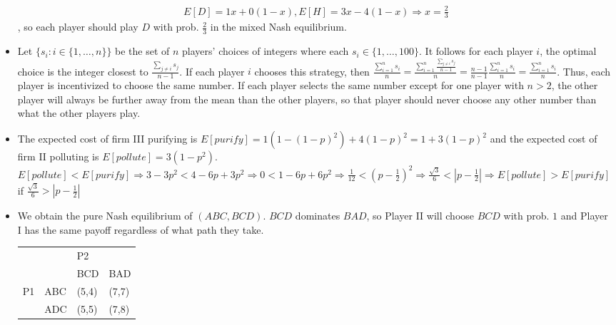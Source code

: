 \documentclass[10pt]{article}[H]
\begin{document}
\begin{itemize}
    \begin{align*}
        E[D]=1x+0(1-x),E[H]=3x-4(1-x)\Rightarrow x=\frac{2}{3}
    \end{align*}
    , so each player should play $D$ with prob. $\frac{2}{3}$ in the mixed Nash equilibrium. 
    \item [\textbf{Exercise 4.14}] Let $\{s_i:i\in\{1,\ldots,n\}\}$ be the set of $n$ players' choices of integers where each $s_i\in\{1,\ldots,100\}$. It follows for each player $i$, the optimal choice is the integer closest to $\frac{\displaystyle\sum_{j\neq i}s_j}{n-1}$. 
    If each player $i$ chooses this strategy, then $\frac{\displaystyle\sum_{i=1}^{n}s_i}{n}=\frac{\displaystyle\sum_{i=1}^{n}\frac{\displaystyle\sum_{j\neq i}s_j}{n-1}}{n}=\frac{n-1}{n-1}\frac{\displaystyle\sum_{i=1}^{n}s_i}{n}=\frac{\displaystyle\sum_{i=1}^{n}s_i}{n}$. Thus, each player is incentivized to choose the same number.
    If each player selects the same number except for one player with $n>2$, the other player will always be further away from the mean than the other players, so that player should never choose any other number than what the other players play. 
    \item [\textbf{Exercise 4.15}] The expected cost of firm III purifying is $E[purify]=1(1-{(1-p)}^2)+4{(1-p)}^2=1+3{(1-p)}^2$ and the expected cost of firm II polluting is $E[pollute]=3(1-p^2)$.
    $E[pollute]<E[purify]\Rightarrow 3-3p^2<4-6p+3p^2\Rightarrow 0<1-6p+6p^2\Rightarrow \frac{1}{12}<(p-\frac{1}{2})^2 \Rightarrow \frac{\sqrt{3}}{6}<|p-\frac{1}{2}|\Rightarrow E[pollute]>E[purify]$ if $\frac{\sqrt{3}}{6}>|p-\frac{1}{2}|$
    \item [\textbf{Exercise 4.17}] We obtain the pure Nash equilibrium of $(ABC,BCD)$. $BCD$ dominates $BAD$, so Player II will choose $BCD$ with prob. $1$ and Player I has the same payoff regardless of what path they take.
    \begin{table}[H]
        \begin{tabular}{llll}
                                &                          & P2                         &                            \\ \cline{2-4} 
        \multicolumn{1}{l|}{}   & \multicolumn{1}{l|}{}    & \multicolumn{1}{l|}{BCD}   & \multicolumn{1}{l|}{BAD}   \\ \cline{2-4} 
        \multicolumn{1}{l|}{P1} & \multicolumn{1}{l|}{ABC} & \multicolumn{1}{l|}{(5,4)} & \multicolumn{1}{l|}{(7,7)} \\ \cline{2-4} 
        \multicolumn{1}{l|}{}   & \multicolumn{1}{l|}{ADC} & \multicolumn{1}{l|}{(5,5)} & \multicolumn{1}{l|}{(7,8)} \\ \cline{2-4} 

\end{tabular}
\end{table}
\end{itemize}
\end{document}
